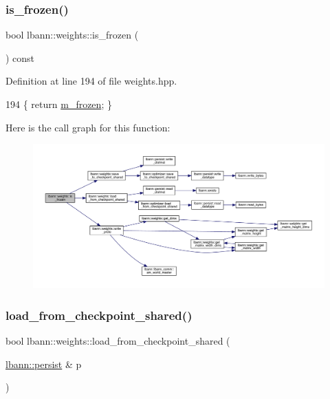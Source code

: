 \subsubsection{\texorpdfstring{is\+\_\+frozen()}{is\_frozen()}}
{\footnotesize\ttfamily bool lbann\+::weights\+::is\+\_\+frozen (\begin{DoxyParamCaption}{ }\end{DoxyParamCaption}) const\hspace{0.3cm}{\ttfamily [inline]}}



Definition at line 194 of file weights.\+hpp.


\begin{DoxyCode}
194 \{ \textcolor{keywordflow}{return} \hyperlink{classlbann_1_1weights_a3962305112ba98ef2eb89c6f7035f6dd}{m\_frozen}; \}
\end{DoxyCode}
Here is the call graph for this function\+:\nopagebreak
\begin{figure}[H]
\begin{center}
\leavevmode
\includegraphics[width=350pt]{classlbann_1_1weights_a5874876052191837679634186c64c388_cgraph}
\end{center}
\end{figure}
\mbox{\label{classlbann_1_1weights_ad41cac4b516d83f086cdfbcdfaa8223c}} 
\subsubsection{\texorpdfstring{load\+\_\+from\+\_\+checkpoint\+\_\+shared()}{load\_from\_checkpoint\_shared()}}
{\footnotesize\ttfamily bool lbann\+::weights\+::load\+\_\+from\+\_\+checkpoint\+\_\+shared (\begin{DoxyParamCaption}\item[{\hyperlink{classlbann_1_1persist}{lbann\+::persist} \&}]{p }\end{DoxyParamCaption})}



